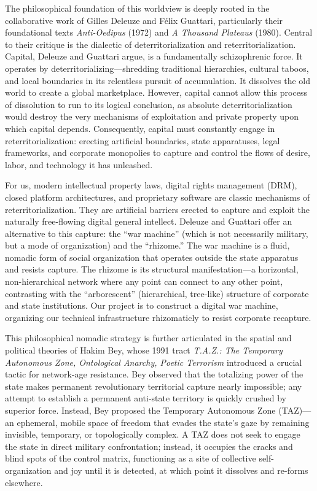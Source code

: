 The philosophical foundation of this worldview is deeply rooted in the
collaborative work of Gilles Deleuze and Félix Guattari, particularly
their foundational texts \emph{Anti-Oedipus} (1972) and \emph{A Thousand
Plateaus} (1980). Central to their critique is the dialectic of
deterritorialization and reterritorialization. Capital, Deleuze and
Guattari argue, is a fundamentally schizophrenic force. It operates by
deterritorializing---shredding traditional hierarchies, cultural taboos,
and local boundaries in its relentless pursuit of accumulation. It
dissolves the old world to create a global marketplace. However, capital
cannot allow this process of dissolution to run to its logical
conclusion, as absolute deterritorialization would destroy the very
mechanisms of exploitation and private property upon which capital
depends. Consequently, capital must constantly engage in
reterritorialization: erecting artificial boundaries, state apparatuses,
legal frameworks, and corporate monopolies to capture and control the
flows of desire, labor, and technology it has unleashed.

For us, modern intellectual property laws, digital rights management
(DRM), closed platform architectures, and proprietary software are
classic mechanisms of reterritorialization. They are artificial barriers
erected to capture and exploit the naturally free-flowing digital
general intellect. Deleuze and Guattari offer an alternative to this
capture: the ``war machine'' (which is not necessarily military, but a
mode of organization) and the ``rhizome.'' The war machine is a fluid,
nomadic form of social organization that operates outside the state
apparatus and resists capture. The rhizome is its structural
manifestation---a horizontal, non-hierarchical network where any point
can connect to any other point, contrasting with the ``arborescent''
(hierarchical, tree-like) structure of corporate and state institutions.
Our project is to construct a digital war machine, organizing our
technical infrastructure rhizomaticly to resist corporate recapture.

This philosophical nomadic strategy is further articulated in the
spatial and political theories of Hakim Bey, whose 1991 tract
\emph{T.A.Z.: The Temporary Autonomous Zone, Ontological Anarchy, Poetic
Terrorism} introduced a crucial tactic for network-age resistance. Bey
observed that the totalizing power of the state makes permanent
revolutionary territorial capture nearly impossible; any attempt to
establish a permanent anti-state territory is quickly crushed by
superior force. Instead, Bey proposed the Temporary Autonomous Zone
(TAZ)---an ephemeral, mobile space of freedom that evades the state's
gaze by remaining invisible, temporary, or topologically complex. A TAZ
does not seek to engage the state in direct military confrontation;
instead, it occupies the cracks and blind spots of the control matrix,
functioning as a site of collective self-organization and joy until it
is detected, at which point it dissolves and re-forms elsewhere.

